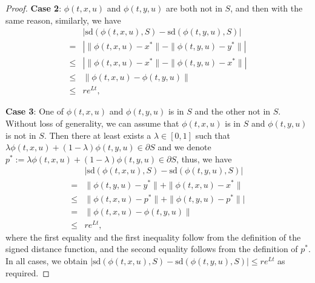 \documentclass[letterpaper, 10 pt, conference]{ieeeconf}
\begin{document}
{\begin{proof}
\textbf{Case 2}: $\phi(t,x,u)$ and $\phi(t,y,u)$ are both not in $S$, and then with the same reason, similarly, we have
\begin{align*}
 & |\mathrm{sd}(\phi(t,x,u),S) - \mathrm{sd}(\phi(t,y,u), S)|\\
 = & |\|\phi(t,x,u) - x^{*}\| - \|\phi(t,y,u)-y^*\||\\
\le & |\|\phi(t,x,u) - x^{*}\| - \|\phi(t,y,u)-x^*\||\\
\le & \|\phi(t,x,u) - \phi(t,y,u)\| \\
\le & re^{Lt},
\end{align*}

\textbf{Case 3}: One of $\phi(t,x,u)$ and $\phi(t,y,u)$ is in $S$ and the other not in $S$. Without loss of generality, we can assume that $\phi(t,x,u)$ is in $S$ and $\phi(t,y,u)$ is not in $S$. Then there at least exists a $\lambda \in [0, 1]$ such that $\lambda \phi(t,x,u) + (1-\lambda)\phi(t,y,u) \in \partial S$ and we denote $p^{*} := \lambda\phi(t,x,u) + (1-\lambda)\phi(t,y,u) \in \partial S$, thus, we have
\begin{align*}
 & |\mathrm{sd}(\phi(t,x,u),S) - \mathrm{sd}(\phi(t,y,u), S)|\\
 = & \|\phi(t,y,u)-y^*\| + \|\phi(t,x,u) - x^{*}\|\\
\leq &  \|\phi(t,x,u) - p^{*}\| + \|\phi(t,y,u)-p^*\||\\
= & \|\phi(t,x,u) - \phi(t,y,u)\|\\
\leq & re^{Lt},
\end{align*}
where the first equality and the first inequality follow from the definition of the signed distance function, and the second equality follows from the definition of $p^{*}$. In all cases, we obtain $|\mathrm{sd}(\phi(t,x,u),S) - \mathrm{sd}(\phi(t,y,u), S)| \leq re^{Lt}$ as required.
\end{proof}
}
\end{document}
